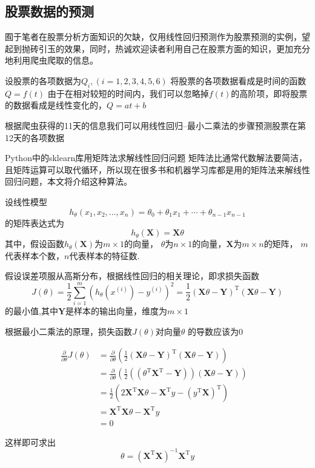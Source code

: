\documentclass[UTF-8]{ctexart}
\begin{document}
\subsection{股票数据的预测}

囿于笔者在股票分析方面知识的欠缺，仅用线性回归预测作为股票预测的实例，望起到抛砖引玉的效果，同时，热诚欢迎读者利用自己在股票方面的知识，更加充分地利用爬虫爬取的信息。

设股票的各项数据为$Q_{i},(i=1,2,3,4,5,6)$
将股票的各项数据看成是时间的函数$Q=f(t)$
由于在相对较短的时间内，我们可以忽略掉$f(t)$的高阶项，即将股票的数据看成是线性变化的，$Q=at+b$

根据爬虫获得的11天的信息我们可以用线性回归--最小二乘法的步骤预测股票在第12天的各项数据

Python中的sklearn库用矩阵法求解线性回归问题
矩阵法比通常代数解法要简洁，且矩阵运算可以取代循环，所以现在很多书和机器学习库都是用的矩阵法来解线性回归问题，本文将介绍这种算法。

设线性模型$$h_{\theta}(x_{1},x_{2},...,x_{n})=\theta_{0}+\theta_{1}x_{1}+\cdots+\theta_{n-1}x_{n-1}$$的矩阵表达式为$$h_{\theta}(\bm{X})=\bm{X}\theta$$
其中，假设函数$h_{\theta}(\bm{X})$为$m\times1$的向量，
$\theta$为$n\times1$的向量，$\bm{X}$为$m\times n$的矩阵，
$m$代表样本个数，$n$代表样本的特征数.

假设误差项服从高斯分布，根据线性回归的相关理论，即求损失函数$$J(\theta)=\frac{1}{2}\sum_{i=1}^{m}(h_{\theta}(x^{(i)})-y^{(i)})^{2}=\frac{1}{2}(\bm{X}\theta-\bm{Y})^{\mathrm{T}}(\bm{X}\theta-\bm{Y})$$
的最小值,其中$\bm{Y}$是样本的输出向量，维度为$m\times1$

根据最小二乘法的原理，损失函数$J(\theta)$对向量$\theta$ 的导数应该为0

\begin{align}
\frac{\partial}{\partial \theta}J(\theta)&=\frac{\partial}{\partial \theta}\left(\frac{1}{2}(\bm{X}\theta-\bm{Y})^{\mathrm{T}}(\bm{X}\theta-\bm{Y})\right)&\nonumber\\
&=\frac{\partial}{\partial \theta}\left(\frac{1}{2}((\theta^{\mathrm{T}}\bm{X}^{\mathrm{T}}-\bm{Y}))(\bm{X}\theta-\bm{Y})\right)&\nonumber\\
&=\frac{1}{2}\left(2\bm{X}^{\mathrm{T}}\bm{X}\theta-\bm{X}^{\mathrm{T}}y-(y^{\mathrm{T}}\bm{X})^{\mathrm{T}}\right)&\nonumber\\
&=\bm{X}^{\mathrm{T}}\bm{X}\theta-\bm{X}^{\mathrm{T}}y&\nonumber\\
&=0&\nonumber
\end{align}

这样即可求出$$\theta=(\bm{X}^{\mathrm{T}}\bm{X})^{-1}\bm{X}^{\mathrm{T}}y$$
\end{document}

